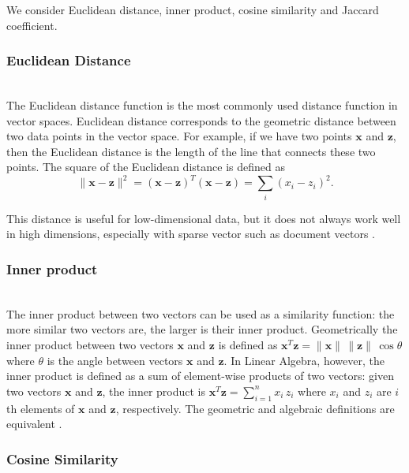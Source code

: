 We consider Euclidean distance, inner product, cosine similarity and
Jaccard coefficient.


\subsubsection{Euclidean Distance} \ \\

The Euclidean distance function is the most commonly used distance
function in vector spaces. Euclidean distance corresponds to
the geometric distance between two data points in the vector space.
For example, if we have two points $\mathbf x$ and
$\mathbf z$, then the Euclidean distance is the
length of the line that connects these two points.
The square of the Euclidean distance is defined as
$$\| \mathbf x - \mathbf z \|^2 = (\mathbf x - \mathbf z)^T (\mathbf x - \mathbf z)  =\sum_i (x_i - z_i)^2.$$

This distance is useful for low-dimensional data, but it does not always work
well in high dimensions, especially with sparse vector such as
document vectors \cite{ertoz2003finding}.


\subsubsection{Inner product} \ \\

The inner product between two vectors can be used as a similarity function:
the more similar two vectors are, the larger is their inner product.
Geometrically the inner product between two vectors $\mathbf x$ and $\mathbf z$
is defined as
$\mathbf x^T \mathbf z = \|\mathbf x \| \, \| \mathbf z \| \, \cos \theta$
where $\theta$ is the angle between vectors $\mathbf x$ and $\mathbf z$.
In Linear Algebra, however, the inner product
is defined as a sum of element-wise products of two vectors:
given two vectors $\mathbf x$ and $\mathbf z$, the inner product is
$\mathbf x^T \mathbf z = \sum_{i = 1}^n x_i \, z_i$ where $x_i$ and $z_i$
are $i$th elements of $\mathbf x$ and $\mathbf z$, respectively.
The geometric and algebraic definitions are equivalent \cite{huges2013calculus}.



\subsubsection{Cosine Similarity} \label{sec:cosine} \ \\


